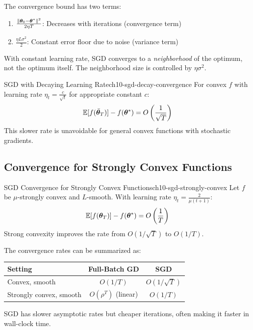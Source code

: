 \documentclass[../../main.tex]{subfiles}
\begin{document}
\begin{important}
The convergence bound has two terms:
\begin{enumerate}
    \item $\frac{\left\lVert \boldsymbol{\theta}_0 - \boldsymbol{\theta}^* \right\rVert^2}{2\eta T}$: Decreases with iterations (convergence term)
    \item $\frac{\eta L \sigma^2}{2}$: Constant error floor due to noise (variance term)
\end{enumerate}
With constant learning rate, SGD converges to a \textit{neighborhood} of the optimum, not the optimum itself. The neighborhood size is controlled by $\eta \sigma^2$.
\end{important}

\begin{theorem}{SGD with Decaying Learning Rate}{ch10-sgd-decay-convergence}
For convex $f$ with learning rate $\eta_t = \frac{c}{\sqrt{t}}$ for appropriate constant $c$:
\[
    \operatorname{\mathbb{E}}[f(\bar{\boldsymbol{\theta}}_T)] - f(\boldsymbol{\theta}^*) = O\left(\frac{1}{\sqrt{T}}\right)
\]
This slower rate is unavoidable for general convex functions with stochastic gradients.
\end{theorem}

\subsection{Convergence for Strongly Convex Functions}

\begin{theorem}{SGD Convergence for Strongly Convex Functions}{ch10-sgd-strongly-convex}
Let $f$ be $\mu$-strongly convex and $L$-smooth. With learning rate $\eta_t = \frac{2}{\mu(t+1)}$:
\[
    \operatorname{\mathbb{E}}[f(\boldsymbol{\theta}_T)] - f(\boldsymbol{\theta}^*) = O\left(\frac{1}{T}\right)
\]
Strong convexity improves the rate from $O(1/\sqrt{T})$ to $O(1/T)$.
\end{theorem}

\begin{principle}
The convergence rates can be summarized as:
\begin{center}
\begin{tabular}{lcc}
\toprule
\textbf{Setting} & \textbf{Full-Batch GD} & \textbf{SGD} \\
\midrule
Convex, smooth & $O(1/T)$ & $O(1/\sqrt{T})$ \\
Strongly convex, smooth & $O(\rho^T)$ (linear) & $O(1/T)$ \\
\bottomrule
\end{tabular}
\end{center}
SGD has slower asymptotic rates but cheaper iterations, often making it faster in wall-clock time.
\end{principle}
\end{document}
